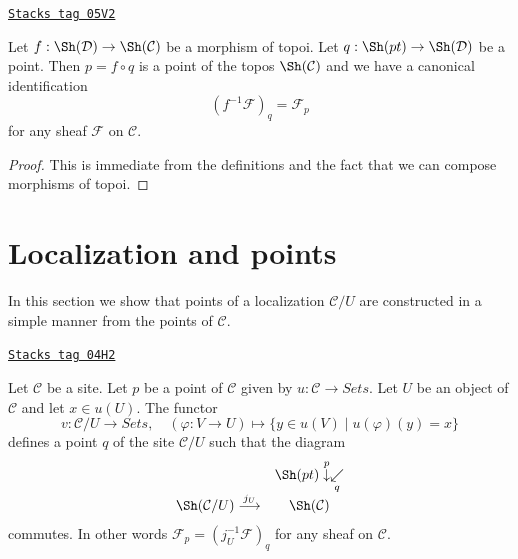 \begin{lemma}
\label{sites-lemma-point-morphism-topoi}
\href{https://stacks.math.columbia.edu/tag/05V2}{\texttt{Stacks tag 05V2}}

Let $f : \Sh(\mathcal{D}) \to \Sh(\mathcal{C})$
be a morphism of topoi. Let $q : \Sh(pt) \to \Sh(\mathcal{D})$
be a point. Then $p = f \circ q$ is a point of the topos
$\Sh(\mathcal{C})$ and we have
a canonical identification
$$
(f^{-1}\mathcal{F})_q = \mathcal{F}_p
$$
for any sheaf $\mathcal{F}$ on $\mathcal{C}$.
\end{lemma}

\begin{proof}
This is immediate from the definitions and the fact that we can
compose morphisms of topoi.
\end{proof}

\section{Localization and points}
\label{sites-section-localize-points}
In this section we show that points of a localization $\mathcal{C}/U$
are constructed in a simple manner from the points of $\mathcal{C}$.

\begin{lemma}
\label{sites-lemma-point-localize}
\href{https://stacks.math.columbia.edu/tag/04H2}{\texttt{Stacks tag 04H2}}

Let $\mathcal{C}$ be a site. Let $p$ be a point of $\mathcal{C}$ given by
$u : \mathcal{C} \to \textit{Sets}$. Let $U$ be an object of $\mathcal{C}$
and let $x \in u(U)$. The functor
$$
v : \mathcal{C}/U \longrightarrow \textit{Sets}, \quad
(\varphi : V \to U) \longmapsto \{y \in u(V) \mid u(\varphi)(y) = x\}
$$
defines a point $q$ of the site $\mathcal{C}/U$ such that the diagram
$$
\begin{array}{cc} & \Sh(pt) \overset{p}{\downarrow}\underset{q}{\swarrow} \\ \Sh(\mathcal{C}/U) \overset{j_U}{\longrightarrow} & \Sh(\mathcal{C})\end{array}
$$
commutes. In other words
$\mathcal{F}_p = (j_U^{-1}\mathcal{F})_q$ for any
sheaf on $\mathcal{C}$.
\end{lemma}


